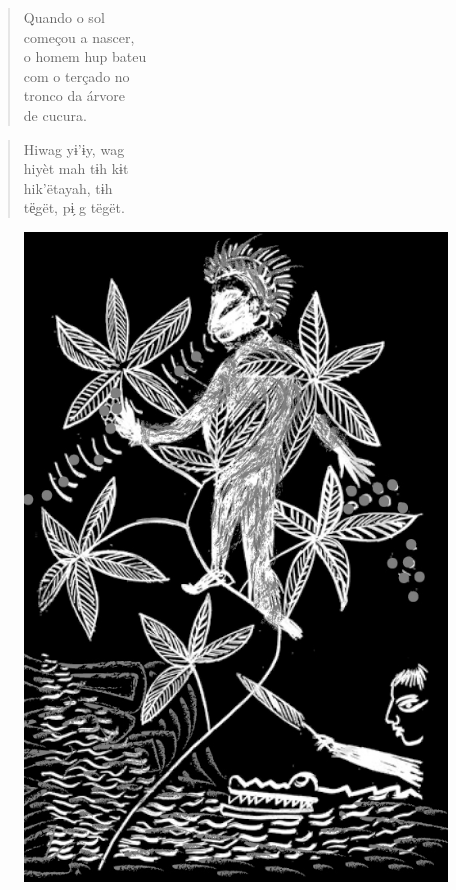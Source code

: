 \mbox{}\vspace*{\fill}

\begin{verse}
Quando o sol\\
começou a nascer,\\
o homem hup bateu\\
com o terçado no\\
tronco da árvore\\
de cucura.
\end{verse}

\begin{verse}
Hiwag yɨ’ɨy, wag\\
hiyèt mah tɨh kɨt\\
hik’ëtayah, tɨh\\
të̖gët, pɨ̗ g tëgët.
\end{verse}

\vspace*{\fill}

\begin{figure}
\vspace*{-1.2cm}
\hspace*{-2.2cm}\includegraphics[width=138mm]{./imgs/img5.jpg}
\end{figure}

